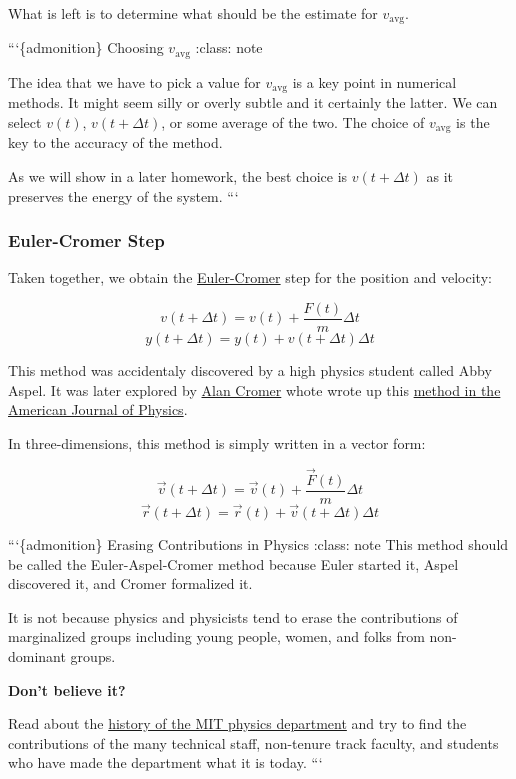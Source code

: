 \documentclass[11pt]{article}
\begin{document}
    What is left is to determine what should be the estimate for
\(v_{\textrm{avg}}\).

```\{admonition\} Choosing \(v_{\textrm{avg}}\) :class: note

The idea that we have to pick a value for \(v_{\textrm{avg}}\) is a key
point in numerical methods. It might seem silly or overly subtle and it
certainly the latter. We can select \(v(t)\), \(v(t+\Delta t)\), or some
average of the two. The choice of \(v_{\textrm{avg}}\) is the key to the
accuracy of the method.

As we will show in a later homework, the best choice is
\(v(t+\Delta t)\) as it preserves the energy of the system. ```

    \subsubsection{Euler-Cromer Step}\label{euler-cromer-step}

Taken together, we obtain the
\href{https://en.wikipedia.org/wiki/Semi-implicit_Euler_method}{Euler-Cromer}
step for the position and velocity:

\[v(t+\Delta t) = v(t) + \dfrac{F(t)}{m} \Delta t\]
\[y(t+\Delta t) = y(t) + v(t+\Delta t) \Delta t\]

This method was accidentaly discovered by a high physics student called
Abby Aspel. It was later explored by
\href{https://en.wikipedia.org/wiki/Alan_Cromer}{Alan Cromer} whote
wrote up this
\href{https://aapt.scitation.org/doi/10.1119/1.10903}{method in the
American Journal of Physics}.

In three-dimensions, this method is simply written in a vector form:

\[\vec{v}(t+\Delta t) = \vec{v}(t) + \dfrac{\vec{F}(t)}{m} \Delta t\]
\[\vec{r}(t+\Delta t) = \vec{r}(t) + \vec{v}(t+\Delta t) \Delta t\]

    ```\{admonition\} Erasing Contributions in Physics :class: note This
method should be called the Euler-Aspel-Cromer method because Euler
started it, Aspel discovered it, and Cromer formalized it.

It is not because physics and physicists tend to erase the contributions
of marginalized groups including young people, women, and folks from
non-dominant groups.

\textbf{Don't believe it?}

Read about the
\href{https://physics.mit.edu/about-physics/our-history/}{history of the
MIT physics department} and try to find the contributions of the many
technical staff, non-tenure track faculty, and students who have made
the department what it is today. ```
\end{document}
